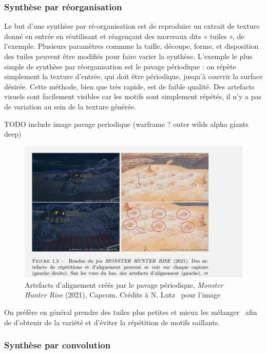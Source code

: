 \subsubsection{Synthèse par réorganisation}

Le but d'une synthèse par ré-organisation est de reproduire un extrait de texture donné en entrée en réutilisant et réagençant des morceaux dits « tuiles », de l'exemple. Plusieurs paramètres commme la taille, découpe, forme, et disposition des tuiles peuvent être modifiés pour faire varier la synthèse. L'exemple le plus simple de synthèse par réorganisation est le pavage périodique : on répète simplement la texture d'entrée, qui doit être périodique, jusqu'à couvrir la surface désirée. Cette méthode, bien que très rapide, est de faible qualité. Des artefacts visuels sont facilement visibles car les motifs sont simplement répétés, il n'y a pas de variation au sein de la texture générée.

{\color{red}TODO include image pavage periodique (warframe ? outer wilds alpha giants deep)}
\begin{figure}
    \centering
    \includegraphics[width=\textwidth]{contenu/resources/images/periodic_tiling}
    \caption[Artefacts d'alignement créés par le pavage périodique]{Artefacts d'alignement créés par le pavage périodique, \textit{Monster Hunter Rise} (2021), Capcom. Crédits à N. Lutz~\cite{lutz_processus_2021} pour l'image}
    \label{fig:pavage_periodique}
\end{figure}

On préfère en général prendre des tuiles plus petites et mieux les mélanger~\cite{heitz_high-performance_2018} afin de d'obtenir de la variété et d'éviter la répétition de motifs saillants. 


\subsubsection{Synthèse par convolution}

